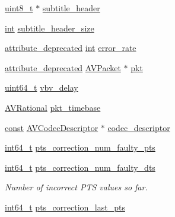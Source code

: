\begin{DoxyCompactItemize}
\hyperlink{lib-src_2ffmpeg_2win32_2stdint_8h_a9a941819355e6f658991890ff66b4b0e}{uint8\+\_\+t} $\ast$ \hyperlink{struct_a_v_codec_context_ab781cbaef6311226481e65a7f1a6d049}{subtitle\+\_\+header}
\item 
\hyperlink{xmltok_8h_a5a0d4a5641ce434f1d23533f2b2e6653}{int} \hyperlink{struct_a_v_codec_context_a0d7c381913c9918caf6969fef8806694}{subtitle\+\_\+header\+\_\+size}
\item 
\hyperlink{attributes_8h_aa6d076561d3a9eea4729ee632652de02}{attribute\+\_\+deprecated} \hyperlink{xmltok_8h_a5a0d4a5641ce434f1d23533f2b2e6653}{int} \hyperlink{struct_a_v_codec_context_ae6c5c21d82ecb2dc36a9180979c81227}{error\+\_\+rate}
\item 
\hyperlink{attributes_8h_aa6d076561d3a9eea4729ee632652de02}{attribute\+\_\+deprecated} \hyperlink{struct_a_v_packet}{A\+V\+Packet} $\ast$ \hyperlink{struct_a_v_codec_context_a664ccfc97e45f52d4086759431f0c1fa}{pkt}
\item 
\hyperlink{lib-src_2ffmpeg_2win32_2stdint_8h_aec6fcb673ff035718c238c8c9d544c47}{uint64\+\_\+t} \hyperlink{struct_a_v_codec_context_a35469829873ff8e5444040323e8e1e59}{vbv\+\_\+delay}
\item 
\hyperlink{struct_a_v_rational}{A\+V\+Rational} \hyperlink{struct_a_v_codec_context_a33a289c990bc3fbcad01c4a09f34da38}{pkt\+\_\+timebase}
\item 
\hyperlink{getopt1_8c_a2c212835823e3c54a8ab6d95c652660e}{const} \hyperlink{struct_a_v_codec_descriptor}{A\+V\+Codec\+Descriptor} $\ast$ \hyperlink{struct_a_v_codec_context_a0a67e07b5cc77bb9dabeba7fa4c41f78}{codec\+\_\+descriptor}
\item 
\hyperlink{lib-src_2ffmpeg_2win32_2stdint_8h_a67a9885ef4908cb72ce26d75b694386c}{int64\+\_\+t} \hyperlink{struct_a_v_codec_context_a6d940d300cd7aca6ae9a9af9ba58e5cc}{pts\+\_\+correction\+\_\+num\+\_\+faulty\+\_\+pts}
\item 
\hyperlink{lib-src_2ffmpeg_2win32_2stdint_8h_a67a9885ef4908cb72ce26d75b694386c}{int64\+\_\+t} \hyperlink{struct_a_v_codec_context_a0de395898981d1bc1edad3198fb64b30}{pts\+\_\+correction\+\_\+num\+\_\+faulty\+\_\+dts}
\begin{DoxyCompactList}\small\item\em Number of incorrect P\+TS values so far. \end{DoxyCompactList}\item 
\hyperlink{lib-src_2ffmpeg_2win32_2stdint_8h_a67a9885ef4908cb72ce26d75b694386c}{int64\+\_\+t} \hyperlink{struct_a_v_codec_context_a16b6e9857d88041fa37a92b722b6c74a}{pts\+\_\+correction\+\_\+last\+\_\+pts}

\end{DoxyCompactItemize}
